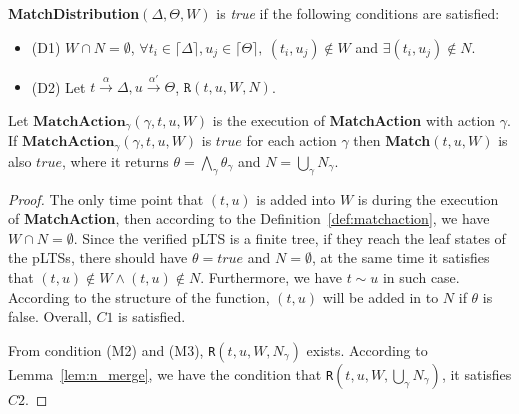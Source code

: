 \documentclass[a4paper,UKenglish,cleveref, autoref]{lipics-v2019}
\begin{document}
\begin{definition}\label{def:matchdistribution}
	\textbf{MatchDistribution}$(\Delta,\Theta,W)$ is \textit{true} if the following conditions are satisfied:
	\begin{itemize}
		\item(D1) $W\cap N=\emptyset$, $\forall t_i\in \lceil\Delta\rceil, u_j\in \lceil\Theta\rceil,\ (t_i,u_j)\notin W$ and $\exists (t_i,u_j)\notin N$.
		\item(D2) Let $t\xrightarrow{\alpha}\Delta, u\xrightarrow{\alpha'}\Theta$, $\texttt{R}(t,u,W,N)$.
	\end{itemize}
\end{definition}

\begin{proposition}Let $\textbf{MatchAction}_\gamma(\gamma,t,u,W)$ is the execution of \textbf{MatchAction} with action $\gamma$.
	If $\textbf{MatchAction}_\gamma(\gamma,t,u,W)$ is $true$ for each action $\gamma$ then \textbf{Match}$(t,u,W)$ is also $true$, where it returns $\theta=\bigwedge_\gamma\theta_\gamma$ and $N=\bigcup_\gamma N_\gamma$.
\end{proposition}
\begin{proof}
	The only time point that $(t,u)$ is added into $W$ is during the execution of \textbf{MatchAction}, then according to the Definition~\ref{def:matchaction}, we have $W\cap N=\emptyset$. Since the verified pLTS is a finite tree, if they reach the leaf states of the pLTSs, there should have $\theta=true$ and $N=\emptyset$, at the same time it satisfies that $(t,u)\notin W\wedge(t,u)\notin N$. Furthermore, we have $t\sim u$ in such case. According to the structure of the function, $(t,u)$ will be added in to $N$ if $\theta$ is false. Overall, $C1$ is satisfied.
	
	From condition (M2) and (M3), \texttt{R}$(t,u,W,N_{\gamma})$ exists. According to Lemma~\ref{lem:n_merge}, we have the condition that \texttt{R}$(t,u,W,\bigcup_{\gamma}N_{\gamma})$, it satisfies $C2$.
\end{proof}
\end{document}
